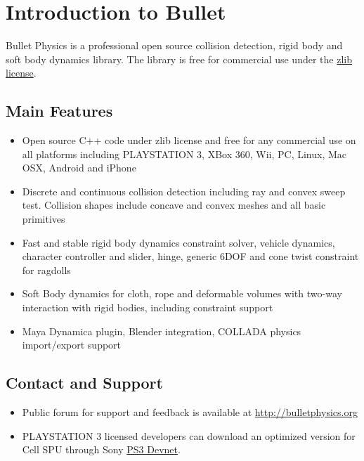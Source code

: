 

\chapter{Introduction to Bullet}
Bullet Physics is a professional open source collision detection, rigid body and soft body dynamics library. The library is free for commercial use under the  \href{http://opensource.org/licenses/zlib-license.php}{zlib license}.

\section{Main Features}

\begin{itemize}
	\item Open source C++ code under zlib license and free for any commercial use on all platforms including PLAYSTATION 3, XBox 360, Wii, PC, Linux, Mac OSX, Android and iPhone
	\item Discrete and continuous collision detection including ray and convex sweep test. Collision shapes include concave and convex meshes and all basic primitives
	\item Fast and stable rigid body dynamics constraint solver, vehicle dynamics, character controller and slider, hinge, generic 6DOF and cone twist constraint for ragdolls
	\item Soft Body dynamics for cloth, rope and deformable volumes with two-way interaction with rigid bodies, including constraint support
	\item Maya Dynamica plugin, Blender integration, COLLADA physics import/export support
\end{itemize}

\section{Contact and Support}
\begin{itemize}
	\item Public forum for support and feedback is available at \url{http://bulletphysics.org}
	\item PLAYSTATION 3 licensed developers can download an optimized version for Cell SPU through Sony \href{https://ps3.scedev.net/projects/spubullet}{PS3 Devnet}.
\end{itemize}

